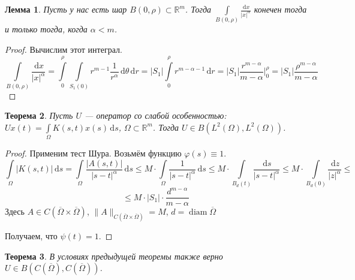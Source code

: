 \documentclass[11pt,openany,a4paper]{scrartcl}
\theoremstyle{plain}
\newtheorem{theorem}{Теорема}[subsection]
\newtheorem{lemma}[theorem]{Лемма}
\theoremstyle{definition}
\newcommand\mb{\mathbb}
\newcommand\real{\mb R}
\newcommand{\dif}{\, \mathrm d}
\DeclareMathOperator{\diam}{diam}
\begin{document}
\begin{lemma}
    Пусть у нас есть шар $B(0, \rho) \subset \real^m$. Тогда
    $\int\limits_{B(0, \rho)} \frac{\dif x}{|x|^\alpha}$ конечен тогда и только 
    тогда, когда $\alpha < m$.
\end{lemma}
\begin{proof}
    Вычислим этот интеграл.
    $$
    \int\limits_{B(0, \rho)} \frac{\dif x}{|x|^\alpha} =
    \int\limits_0^\rho \int\limits_{S_1(0)}
    r^{m-1}\frac{1}{r^\alpha}\dif \theta \dif r =
    |S_1| \int\limits_0^\rho r^{m - \alpha - 1} \dif r =
    |S_1| \frac{r^{m - \alpha}}{m - \alpha}\bigg|_0^\rho =
    |S_1|\frac{\rho^{m - \alpha}}{m - \alpha}
    $$
\end{proof}
\begin{theorem}
    Пусть $U$ — оператор со слабой особенностью:
    $Ux(t) = \int\limits_\Omega K(s,t) x(s) \dif s$, $\Omega \subset \real^m$.
    Тогда $U\in B(L^2(\Omega), L^2(\Omega))$.
\end{theorem}
\begin{proof}
    Применим тест Шура. Возьмём функцию $\varphi(s) \equiv 1$.
    $$
    \int\limits_\Omega|K(s, t)|\dif s =
    \int\limits_\Omega \frac{|A(s,t)|}{|s-t|^\alpha}\dif s \leqslant
    M\cdot \int\limits_\Omega \frac{1}{|s-t|^\alpha}\dif s \leqslant
    M\cdot \int\limits_{B_d(t)} \frac{\dif s}{|s - t|^\alpha} \leqslant
    M \cdot \int\limits_{B_d(0)} \frac{\dif z}{|z|^\alpha} \leqslant
    $$
    $$
    \leqslant M \cdot |S_1|\cdot \frac{d^{m - \alpha}}{m - \alpha}
    $$
    Здесь $A \in C(\overline\Omega \times \overline\Omega)$,
    $\|A\|_{C(\overline\Omega \times \overline\Omega)} = M$,
    $d = \diam \overline\Omega$
    
    Получаем, что $\psi(t) = 1$.
\end{proof}
\begin{theorem}
    В условиях предыдущей теоремы также верно
    $U \in B(C(\overline\Omega), C(\overline\Omega))$.
\end{theorem}
\end{document}
